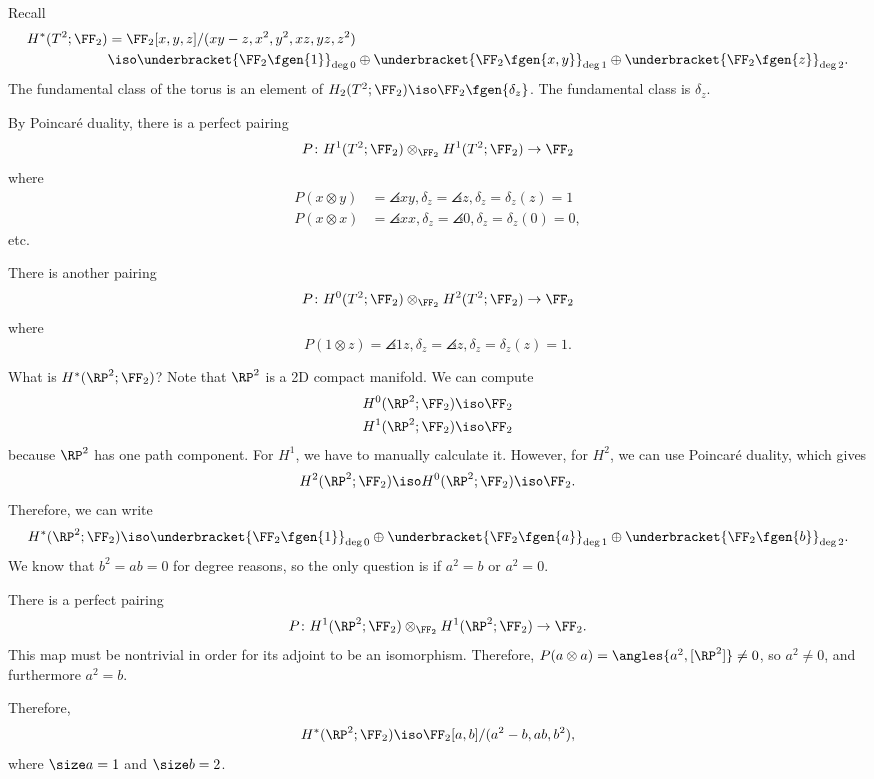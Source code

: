 \documentclass{standalone}
\begin{document}
\begin{example}
  Recall
  \begin{align*}
    H^*(T^2; \FF_2) &= \FF_2[x, y, z]/(xy - z, x^2, y^2, xz, yz, z^2) \\
      &\iso \underbracket{\FF_2\fgen{1}}_{\deg 0} \oplus
            \underbracket{\FF_2\fgen{x, y}}_{\deg 1} \oplus
            \underbracket{\FF_2\fgen{z}}_{\deg 2}.
  \end{align*}
  The fundamental class of the torus is
  an element of \(H_2(T^2; \FF_2) \iso \FF_2\fgen{\delta_z}\).
  The fundamental class is \(\delta_z\).

  By Poincar\'e duality, there is a perfect pairing
  \[
    P \colon H^1(T^2; \FF_2) \otimes_{\FF_2} H^1(T^2; \FF_2) \to \FF_2
  \]
  where
  \begin{align*}
    P(x \otimes y) &= \angles{xy, \delta_z}
                    = \angles{z, \delta_z}
                    = \delta_z(z) = 1 \\
    P(x \otimes x) &= \angles{xx, \delta_z}
                    = \angles{0, \delta_z}
                    = \delta_z(0) = 0,
  \end{align*}
  etc.

  There is another pairing
  \[
    P \colon H^0(T^2; \FF_2) \otimes_{\FF_2} H^2(T^2; \FF_2) \to \FF_2
  \]
  where
  \[
    P(1 \otimes z) = \angles{1z, \delta_z}
                   = \angles{z, \delta_z}
                   = \delta_z(z) = 1.
  \]
\end{example}

\begin{example}
  What is \(H^*(\RP^2; \FF_2)\)?
  Note that \(\RP^2\) is a 2D compact manifold.
  We can compute
  \begin{gather*}
    H^0(\RP^2; \FF_2) \iso \FF_2 \\
    H^1(\RP^2; \FF_2) \iso \FF_2
  \end{gather*}
  because \(\RP^2\) has one path component.
  For \(H^1\), we have to manually calculate it.
  However, for \(H^2\), we can use Poincar\'e duality, which gives
  \[
    H^2(\RP^2; \FF_2) \iso H^0(\RP^2; \FF_2) \iso \FF_2.
  \]
  Therefore, we can write
  \[
    H^*(\RP^2; \FF_2) \iso \underbracket{\FF_2\fgen{1}}_{\deg 0} \oplus
                           \underbracket{\FF_2\fgen{a}}_{\deg 1} \oplus
                           \underbracket{\FF_2\fgen{b}}_{\deg 2}.
  \]
  We know that \(b^2 = ab = 0\) for degree reasons, so the only question is
  if \(a^2 = b\) or \(a^2 = 0\).

  There is a perfect pairing
  \[
    P \colon H^1(\RP^2; \FF_2) \otimes_{\FF_2} H^1(\RP^2; \FF_2) \to \FF_2.
  \]
  This map must be nontrivial in order for its adjoint to be an isomorphism.
  Therefore, \(P(a \otimes a) = \angles{a^2, [\RP^2]} \neq 0\), so
  \(a^2 \neq 0\), and furthermore \(a^2 = b\).

  Therefore,
  \[
    H^*(\RP^2; \FF_2) \iso \FF_2[a, b]/(a^2 - b, ab, b^2),
  \]
  where \(\size a = 1\) and \(\size b = 2\).
\end{example}
\end{document}
